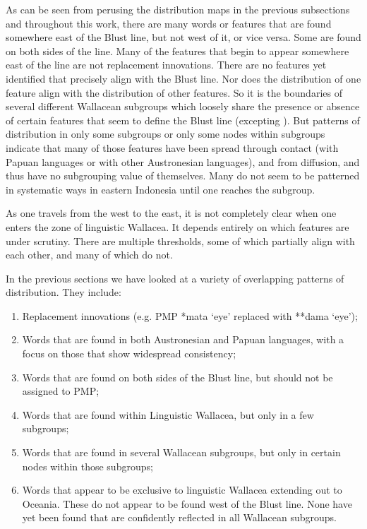 As can be seen from perusing the distribution maps in the previous
subsections and throughout this work,
there are many words or features that are found somewhere east
of the Blust line,
but not west of it, or vice versa.
Some are found on both sides of the line.
Many of the features that begin to appear somewhere east of the
line are not replacement innovations.
There are no features yet identified that precisely align with the Blust line.
Nor does the distribution of one feature align with the distribution of other features.
So it is the boundaries of several different Wallacean subgroups
which loosely share the presence or absence of certain features
that seem to define the Blust line (excepting ).
But patterns of distribution in only some subgroups or only some
nodes within subgroups indicate that many of those features have
been spread through contact (with Papuan languages or with other
Austronesian languages), and from diffusion, and thus have no subgrouping value of themselves.
Many do not seem to be patterned in systematic ways in eastern
Indonesia until one reaches the  subgroup.

As one travels from the west to the east,
it is not completely clear when one enters the zone of linguistic Wallacea.
It depends entirely on which features are under scrutiny.
There are multiple thresholds,
some of which partially align with each other,
and many of which do not.

In the previous sections we have looked at a variety of overlapping patterns of distribution.
They include: 

\begin{enumerate}
	\item	Replacement innovations (e.g.
				PMP *mata ‘eye’ replaced with  **dama ‘eye’);
	\item	Words that are found in both Austronesian
				and Papuan languages, with a focus on those that show widespread
				consistency; \item	Words that are found on both sides of the Blust line,
				but should not be assigned to PMP;
	\item	Words that are found within Linguistic Wallacea,
				but only in a few subgroups;
	\item	Words that are found in several Wallacean subgroups,
				but only in certain nodes within those subgroups;
	\item	Words that appear to be exclusive to linguistic Wallacea
				extending out to Oceania.
				These do not appear to be found west of the Blust line.
				None have yet been found that are confidently reflected in all Wallacean subgroups.
\end{enumerate}

